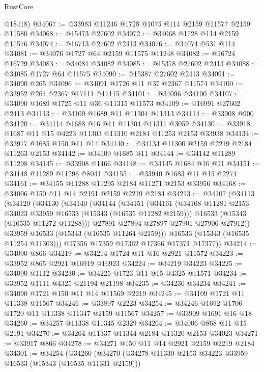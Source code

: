 \begin{lexlean}{RustCore}
\begin{coremodule}
      @18418)
@34067 := @33983 @11246 @1728 @1075 @114 @2159 @11577 @2159 @11580
@34068 := @15473 @27602
@34072 := @34068 @1728 @114 @2159 @11576
@34074 := @16713 @27602 @2413
@34076 := @34074 @531 @114
@34081 := @34076 @1727 @64 @2159 @11575 @11248
@34082 := @16724 @16729
@34083 := @34081 @34082
@34085 := @15378 @27602 @2413
@34088 := @34085 @1727 @64 @11575
@34090 := @15387 @27602 @2413
@34091 := @34090 @265
@34096 := @34091 @1726 @11 @37 @2367 @11574
@34100 := @33952 @264 @2367 @17111 @17115
@34101 := @34096 @34100
@34107 := @34090 @1689 @1725 @11 @36 @11315 @11573
@34109 := @16991 @27602 @2413
@34113 := @34109 @1689 @11 @11304 @11313
@34114 := @33908 @900
@34120 := @34114 @1688 @16 @11 @11304 @11311 @3059
@34130 := @33918 @1687 @11 @15 @4223 @11303 @11310 @2184 @11253 @2153 @33938
@34134 := @33917 @1685 @150 @11 @14
@34140 := @34134 @11300 @2159 @2219 @2184 @11263 @2153
@34142 := @34109 @1685 @11
@34144 := @34142 @11289 @11298
@34145 := @33908 @1466
@34148 := @34145 @1684 @16 @11
@34151 := @34148 @11289 @11296 @8041
@34155 := @33940 @1683 @11 @15 @2274
@34161 := @34155 @11288 @11295 @2184 @11271 @2153 @33956
@34168 := @34006 @150 @11 @14 @2191 @2159 @2219 @2184
@34213 := @34107
    (@34113
      (@34120
        (@34130
          (@34140
            (@34144
              (@34151
                (@34161
                  (@34168 @11281 @2153 @34023 @33959 @16533 (@15343 (@16535 @11282 @2159)))
                  @16533
                  (@15343 (@16535 @11272 @11288)))
                @27891
                @27894
                @27897
                @27901
                @27906
                @27912))
            @33959
            @16533
            (@15343 (@16535 @11264 @2159)))
          @16533
          (@15343 (@16535 @11254 @11303)))
        @17356
        @17359
        @17362
        @17366
        @17371
        @17377))
@34214 := @34090 @866
@34219 := @34214 @1724 @11 @16 @2921 @11572
@34223 := @33952 @865 @2921 @16919 @16923
@34224 := @34219 @34223
@34225 := @34090 @1112
@34230 := @34225 @1723 @11 @15 @4325 @11571
@34234 := @33952 @1111 @4325 @21194 @21198
@34235 := @34230 @34234
@34241 := @34090 @1721 @150 @11 @14 @11569 @2219
@34245 := @34109 @1721 @11 @11338 @11567
@34246 := @33897 @2223
@34254 := @34246 @1692 @1706 @1720 @11 @11338 @11347 @2159 @11567
@34257 := @33909 @1691 @16 @18
@34260 := @34257 @11338 @11345 @2329
@34264 := @34006 @868 @11 @15 @2191
@34270 := @34264 @11337 @11344 @2184 @11320 @2153 @34023
@34271 := @33917 @866
@34278 := @34271 @150 @11 @14 @2921 @2159 @2219 @2184
@34301 := @34254
    (@34260
      (@34270
        (@34278 @11330 @2153 @34223 @33959 @16533 (@15343 (@16535 @11331 @2159)))

\end{coremodule}
\end{lexlean}
